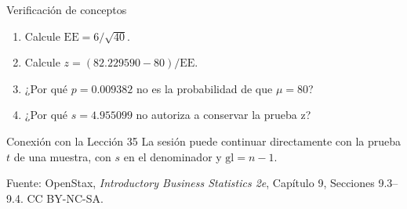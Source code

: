 \documentclass[aspectratio=169,10pt,spanish]{beamer}
\begin{document}
\begin{frame}{Verificación de conceptos}
  \begin{enumerate}
    \item Calcule $\mathrm{EE}=6/\sqrt{40}$.
    \item Calcule $z=(82.229590-80)/\mathrm{EE}$.
    \item ¿Por qué $p=0.009382$ no es la probabilidad de que $\mu=80$?
    \item ¿Por qué $s=4.955099$ no autoriza a conservar la prueba z?
  \end{enumerate}

  \vspace{0.6em}
  \begin{block}{Conexión con la Lección 35}
    La sesión puede continuar directamente con la prueba $t$ de una muestra,
    con $s$ en el denominador y $\mathrm{gl}=n-1$.
  \end{block}

  \vfill
  \scriptsize Fuente: OpenStax, \textit{Introductory Business Statistics 2e},
  Capítulo 9, Secciones 9.3--9.4. CC BY-NC-SA.
\end{frame}

\appendix
\end{document}
